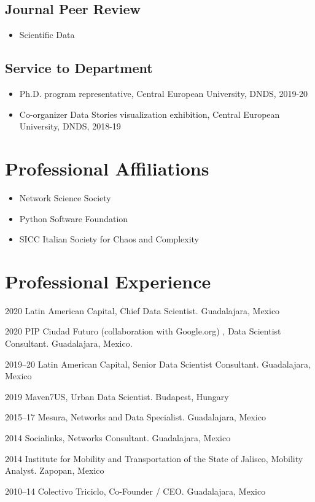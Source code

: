 \documentclass{academiccv}
\begin{document}
\subsection*{Journal Peer Review}
\begin{itemize}
  \item Scientific Data
\end{itemize}

\subsection*{Service to Department}
\begin{itemize}
	\item Ph.D. program representative, Central European University, DNDS, 2019-20
	\item Co-organizer Data Stories visualization exhibition, Central European University, DNDS, 2018-19
\end{itemize}

\section*{Professional Affiliations}
\begin{itemize}
	\item Network Science Society
	\item Python Software Foundation
	\item SICC Italian Society for Chaos and Complexity
\end{itemize}


\section*{Professional Experience}
\begin{tablist}
	\item[2020] \tab Latin American Capital, Chief Data Scientist. Guadalajara, Mexico
	\item[2020] \tab PIP Ciudad Futuro (collaboration with Google.org) , Data Scientist Consultant. Guadalajara, Mexico. 
	\item[2019--20] \tab Latin American Capital, Senior Data Scientist Consultant. Guadalajara, Mexico
	\item[2019] \tab Maven7US, Urban Data Scientist. Budapest, Hungary
	\item[2015--17] \tab Mesura, Networks and Data Specialist. Guadalajara, Mexico
	\item[2014] \tab Socialinks, Networks Consultant. Guadalajara, Mexico
	\item[2014] \tab Institute for Mobility and Transportation of the State of Jalisco, Mobility Analyst. Zapopan, Mexico
	\item[2010--14] \tab Colectivo Triciclo, Co-Founder / CEO. Guadalajara, Mexico
\end{tablist}
\end{document}
